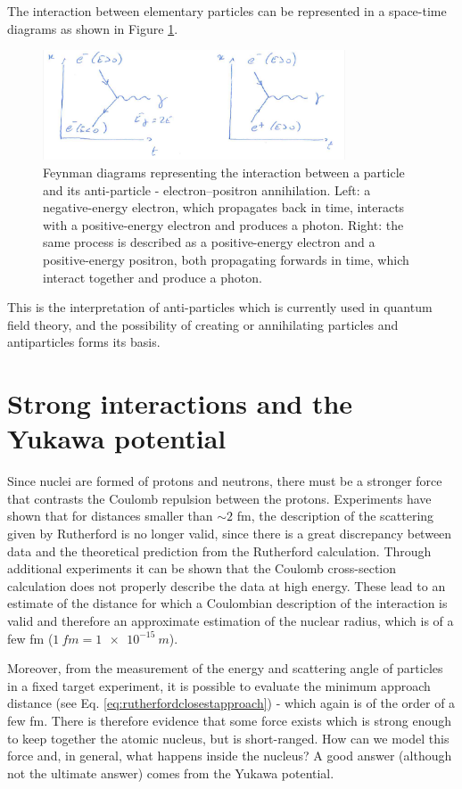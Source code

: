 The interaction between elementary particles can be represented in a space-time diagrams as shown in Figure \ref{fig:feynman-antiparticle}.
\begin{figure}[h]
    \includegraphics[width=0.8\textwidth]{Figures/feynman-antiparticle}
    \caption{Feynman diagrams representing the interaction between a particle and its anti-particle - electron--positron annihilation. Left: a negative-energy electron, which propagates back in time, interacts with a positive-energy electron and produces a photon. Right: the same process is described as a positive-energy electron and a positive-energy positron, both propagating forwards in time, which interact together and produce a photon.}
    \label{fig:feynman-antiparticle}
\end{figure}
This is the interpretation of anti-particles which is currently used in quantum field theory, and the possibility of creating or annihilating particles and antiparticles forms its basis.

\section{Strong interactions and the Yukawa potential}
Since nuclei are formed of protons and neutrons, there must be a stronger force that contrasts the Coulomb repulsion between the protons. Experiments have shown that for distances smaller than $\sim 2$ fm, the description of the scattering given by Rutherford is no longer valid, since there is a great discrepancy between data and the theoretical prediction from the Rutherford calculation.
Through additional experiments it can be shown that the Coulomb cross-section calculation does not properly describe the data at high energy. These lead to an estimate of the distance for which a Coulombian description of the interaction is valid and therefore an approximate estimation of the nuclear radius, which is of a few \si{fm} (\(\SI{1}{fm} = \SI{1e-15}{m}\)).

Moreover, from the measurement of the energy and scattering angle of particles in a fixed target experiment, it is possible to evaluate the minimum approach distance (see Eq. \eqref{eq:rutherfordclosestapproach}) - which again is of the order of a few \si{fm}. There is therefore evidence that some force exists which is strong enough to keep together the atomic nucleus, but is short-ranged. How can we model this force and, in general, what happens inside the nucleus? A good answer (although not the ultimate answer) comes from the Yukawa potential.

